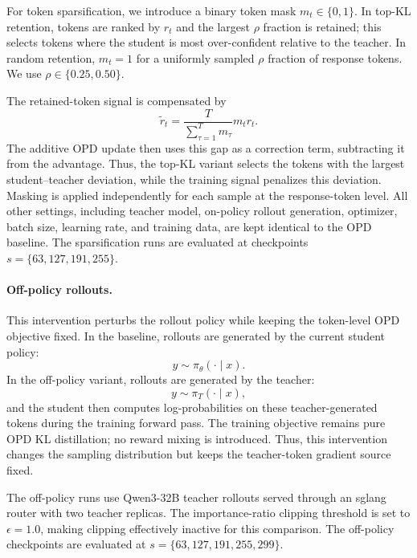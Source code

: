 For token sparsification, we introduce a binary token mask
$m_t\in\{0,1\}$. In top-KL retention, tokens are ranked by $r_t$ and the
largest $\rho$ fraction is retained; this selects tokens where the student
is most over-confident relative to the teacher. In random retention,
$m_t=1$ for a uniformly sampled $\rho$ fraction of response tokens. We use
$\rho\in\{0.25,0.50\}$.

The retained-token signal is compensated by
\[
    \widetilde{r}_t
    =
    \frac{T}{\sum_{\tau=1}^{T}m_\tau}
    m_t r_t .
    \label{eq:masked-opd-signal}
\]
The additive OPD update then uses this gap as a correction term, subtracting
it from the advantage. Thus, the top-KL variant selects the tokens with the
largest student--teacher deviation, while the training signal penalizes this
deviation. Masking is applied independently for each sample at the
response-token level. All other settings, including teacher model,
on-policy rollout generation, optimizer, batch size, learning rate, and
training data, are kept identical to the OPD baseline. The sparsification
runs are evaluated at checkpoints $s=\{63,127,191,255\}$.

\paragraph{Off-policy rollouts.}
This intervention perturbs the rollout policy while keeping the token-level
OPD objective fixed. In the baseline, rollouts are generated by the current
student policy:
\[
    y \sim \pi_\theta(\cdot\mid x).
\]
In the off-policy variant, rollouts are generated by the teacher:
\[
    y \sim \pi_T(\cdot\mid x),
\]
and the student then computes log-probabilities on these teacher-generated
tokens during the training forward pass. The training objective remains pure
OPD KL distillation; no reward mixing is introduced. Thus, this intervention
changes the sampling distribution but keeps the teacher-token gradient
source fixed.

The off-policy runs use Qwen3-32B teacher rollouts served through an sglang
router with two teacher replicas. The importance-ratio clipping threshold
is set to $\epsilon=1.0$, making clipping effectively inactive for this
comparison. The off-policy checkpoints are evaluated at
$s=\{63,127,191,255,299\}$.



